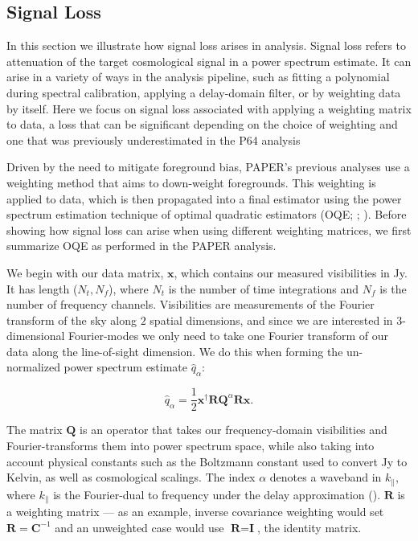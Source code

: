\documentclass[preprint2,numberedappendix,tighten]{aastex6}  %
\begin{document}

\subsection{Signal Loss}
\label{sec:SiglossOverview}

In this section we illustrate how signal loss arises in analysis. Signal loss refers to attenuation of the target cosmological signal in a power spectrum estimate. It can arise in a variety of ways in the analysis pipeline, such as fitting a polynomial during spectral calibration, applying a delay-domain filter, or by weighting data by itself. Here we focus on signal loss associated with applying a weighting matrix to data, a loss that can be significant depending on the choice of weighting and one that was previously underestimated in the P64 analysis

Driven by the need to mitigate foreground bias, PAPER's previous analyses use a weighting method that aims to down-weight foregrounds. This weighting is applied to data, which is then propagated into a final estimator using the power spectrum estimation technique of optimal quadratic estimators (OQE; \citealt{liu_tegmark2011}; \citealt{liu_et_al2014b}). Before showing how signal loss can arise when using different weighting matrices, we first summarize OQE as performed in the PAPER analysis.

We begin with our data matrix, $\textbf{x}$, which contains our measured visibilities in Jy. It has length ($N_{t}, N_{f}$), where $N_{t}$ is the number of time integrations and $N_{f}$ is the number of frequency channels. Visibilities are measurements of the Fourier transform of the sky along $2$ spatial dimensions, and since we are interested in $3$-dimensional Fourier-modes we only need to take one Fourier transform of our data along the line-of-sight dimension. We do this when forming the un-normalized power spectrum estimate $\hat{q}_{\alpha}$:

\begin{equation}
\label{eq:qhat}
\hat{q}_{\alpha} = \frac{1}{2}\textbf{x}^{\dagger}\textbf{R}\textbf{Q}^{\alpha}\textbf{R}\textbf{x}.
\end{equation}

\noindent The matrix $\textbf{Q}$ is an operator that takes our frequency-domain visibilities and Fourier-transforms them into power spectrum space, while also taking into account physical constants such as the Boltzmann constant used to convert Jy to Kelvin, as well as cosmological scalings. The index $\alpha$ denotes a waveband in $k_{\parallel}$, where $k_{\parallel}$ is the Fourier-dual to frequency under the delay approximation (\citealt{parsons_et_al2012b}). $\textbf{R}$ is a weighting matrix --- as an example, inverse covariance weighting would set $\textbf{R} = \textbf{C}^{-1}$ and an unweighted case would use $\textbf{R} = \textbf{I}$, the identity matrix.
\end{document}
